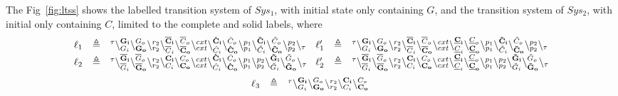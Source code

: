 The Fig~\ref{fig:ltss} shows the labelled transition system of $Sys_1$, with initial state only  containing  $G$,  and the transition system of $Sys_2$, with initial only containing $C$, limited to the complete
and solid labels, where
{\tiny \[
\begin{array}{lcl@{\hspace{0.3cm}} lcl}
\ell_1 &\defeq & \startchain{\silent}\chainedlink{G_i}{\bf G_i}\chainedlink{\bf G_o}{ G_o}\chainedlink{r_2}{r_2}\chainedlink{\overline{C}_i}{\bf \overline{C}_i}\chainedlink{\bf \overline{C}_o}{\overline{C}_o}
\chainedlink{cxt}{cxt}\chainedlink{\hat{C}_i}{\bf \hat{C}_i}\chainedlink{\bf \hat{C}_o}{\hat{C}_o}
\chainedlink{p_1}{p_1}\chainedlink{\tilde{C}_i}{\bf \tilde{C}_i}\chainedlink{\bf \tilde{C}_o}{\tilde{C}_o}\chainedlink{p_2}{p_2}\chainend{\silent}
&
\ell'_1 &\defeq & \startchain{\silent}\chainedlink{G_i}{\bf G_i}\chainedlink{\bf G_o}{ G_o}\chainedlink{r_2}{r_2}\chainedlink{\overline{C}_i}{\bf \overline{C}_i}\chainedlink{\bf \overline{C}_o}{\overline{C}_o}
\chainedlink{cxt}{cxt}\chainedlink{\underline{C}_i}{\bf \underline{C}_i}\chainedlink{\bf \underline{C}_o}{\underline{C}_o}
\chainedlink{p_1}{p_1}\chainedlink{\tilde{C}_i}{\bf \tilde{C}_i}\chainedlink{\bf \tilde{C}_o}{\tilde{C}_o}\chainedlink{p_2}{p_2}\chainend{\silent}\\
\ell_2 &\defeq & \startchain{\silent}\chainedlink{\overline{G}_i}{\bf \overline{G}_i}\chainedlink{\bf \overline{G}_o}{ \overline{G}_o}\chainedlink{r_2}{r_2}\chainedlink{C_i}{\bf C_i}\chainedlink{\bf C_o}{C_o}
\chainedlink{cxt}{cxt}\chainedlink{\hat{C}_i}{\bf \hat{C}_i}\chainedlink{\bf \hat{C}_o}{\hat{C}_o}
\chainedlink{p_1}{p_1}\chainedlink{p_2}{p_2}\chainedlink{\tilde{G}_i}{\bf \tilde{G}_i}\chainedlink{\bf \tilde{G}_o}{\tilde{G}_o}\chainend{\silent}
&
\ell'_2 &\defeq &  \startchain{\silent}\chainedlink{\overline{G}_i}{\bf \overline{G}_i}\chainedlink{\bf \overline{G}_o}{ \overline{G}_o}\chainedlink{r_2}{r_2}\chainedlink{C_i}{\bf C_i}\chainedlink{\bf C_o}{C_o}
\chainedlink{cxt}{cxt}\chainedlink{\underline{C}_i}{\bf \underline{C}_i}\chainedlink{\bf \underline{C}_o}{\underline{C}_o}
\chainedlink{p_1}{p_1}\chainedlink{p_2}{p_2}\chainedlink{\tilde{G}_i}{\bf \tilde{G}_i}\chainedlink{\bf \tilde{G}_o}{\tilde{G}_o}\chainend{\silent}
\end{array}
\]
\[
\begin{array}{lcl @{\hspace{0.3cm}}lcl}
\ell_3 & \defeq &  \startchain{\silent}\chainedlink{G_i}{\bf G_i}\chainedlink{\bf G_o}{G_o}\chainedlink{r_2}{r_2}\chainedlink{C_i}{\bf C_i}\chainedlink{\bf C_o}{C_o}

\end{array}\]}

